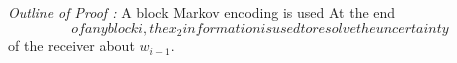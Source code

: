 \documentclass[preview]{standalone}
\begin{document}
\begin{center}
\textit{Outline of Proof :} A block Markov encoding is used At the end \[ of any block i, the x_2 information is used to resolve the uncertainty \] of the receiver about $w_{i-1}.$
\end{center}
\end{document}
